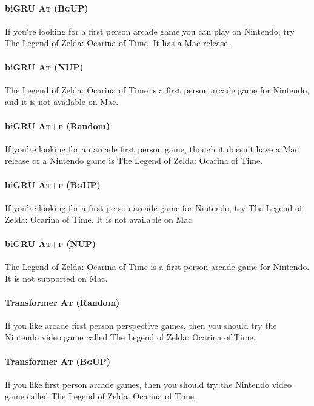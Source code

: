 \paragraph{biGRU \textsc{At (BgUP)}}
If you're looking for a first person arcade game you can play on Nintendo, try The Legend of Zelda: Ocarina of Time. It has a Mac release.

\paragraph{biGRU \textsc{At} (NUP)}
The Legend of Zelda: Ocarina of Time is a first person arcade game for Nintendo, and it is not available on Mac.



\paragraph{biGRU \textsc{At+p} (Random)}
If you're looking for an arcade first person game, though it doesn't have a Mac release or a Nintendo game is The Legend of Zelda: Ocarina of Time.

\paragraph{biGRU \textsc{At+p (BgUP)}}
If you're looking for a first person arcade game for Nintendo, try The Legend of Zelda: Ocarina of Time. It is not available on Mac.

\paragraph{biGRU \textsc{At+p} (NUP)}
The Legend of Zelda: Ocarina of Time is a first person arcade game for Nintendo. It is not supported on Mac.




\paragraph{Transformer \textsc{At} (Random)}
If you like arcade first person perspective games, then you should try the Nintendo video game called The Legend of Zelda: Ocarina of Time.

\paragraph{Transformer \textsc{At (BgUP)}}
If you like first person arcade games, then you should try the Nintendo video game called The Legend of Zelda: Ocarina of Time.

